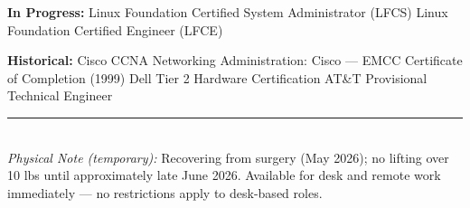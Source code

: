\documentclass[9pt,letterpaper]{extarticle}
\begin{document}
\textbf{In Progress:} Linux Foundation Certified System Administrator (LFCS) \textbullet{} Linux Foundation Certified Engineer (LFCE)

\textbf{Historical:} Cisco CCNA \textbullet{} Networking Administration: Cisco --- EMCC Certificate of Completion (1999) \textbullet{} Dell Tier 2 Hardware Certification \textbullet{} AT\&T Provisional Technical Engineer

\vspace{8pt}
\noindent\rule{\linewidth}{0.4pt}
\vspace{3pt}
\\[2pt]
{\small\textit{Physical Note (temporary):} Recovering from surgery (May 2026); no lifting over 10 lbs until approximately late June 2026. Available for desk and remote work immediately --- no restrictions apply to desk-based roles.}
\end{document}
